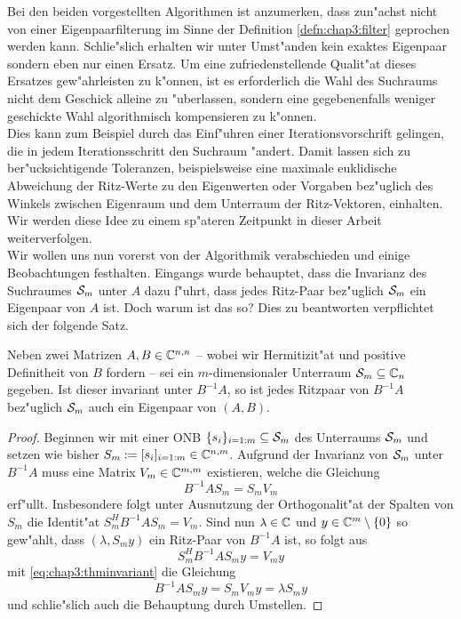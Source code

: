 Bei den beiden vorgestellten Algorithmen ist anzumerken, dass zun"achst nicht von einer Eigenpaarfilterung im Sinne der Definition \ref{defn:chap3:filter} geprochen werden kann.
Schlie"slich erhalten wir unter Umst"anden kein exaktes Eigenpaar sondern eben nur einen Ersatz.
Um eine zufriedenstellende Qualit"at dieses Ersatzes gew"ahrleisten zu k"onnen, ist es erforderlich die Wahl des Suchraums nicht dem Geschick alleine zu "uberlassen, sondern eine gegebenenfalls weniger geschickte Wahl algorithmisch kompensieren zu k"onnen.\\

Dies kann zum Beispiel durch das Einf"uhren einer Iterationsvorschrift gelingen, die in jedem Iterationsschritt den Suchraum "andert.
Damit lassen sich zu ber"ucksichtigende Toleranzen, beispielsweise eine maximale euklidische Abweichung der Ritz-Werte zu den Eigenwerten oder Vorgaben bez"uglich des Winkels zwischen Eigenraum und dem Unterraum der Ritz-Vektoren, einhalten.
Wir werden diese Idee zu einem sp"ateren Zeitpunkt in dieser Arbeit weiterverfolgen.\\

Wir wollen uns nun vorerst von der Algorithmik verabschieden und einige Beobachtungen
festhalten. Eingangs wurde behauptet, dass die Invarianz des Suchraumes $\S_m$ unter
$A$ dazu f"uhrt, dass jedes Ritz-Paar bez"uglich $\S_m$ ein Eigenpaar von $A$ ist.
Doch warum ist das so? Dies zu beantworten verpflichtet sich der folgende Satz.

\newpage

\begin{thm}\label{thm:chap3:invariant}
Neben zwei Matrizen $A,B\in\Cnn$ -- wobei wir Hermitizit"at und positive Definitheit von $B$ fordern -- sei ein $m$-dimensionaler Unterraum $\S_m \subseteq \C_n$ gegeben.
Ist dieser invariant unter $B^{-1}A$, so ist jedes Ritzpaar von $B^{-1}A$
bez"uglich $\S_m$ auch ein Eigenpaar von $(A,B)$.
\end{thm}

\begin{proof}
Beginnen wir mit einer ONB $\{s_i\}_{i=1:m}\subseteq\S_m$ des Unterraums $\S_m$
und setzen wie bisher $S_m := [s_i]_{i=1:m}\in\C^{n,m}$. Aufgrund der Invarianz
von $\S_m$ unter $B^{-1}A$ muss eine Matrix $V_m \in \C^{m,m}$ existieren, welche
die Gleichung
\begin{equation}\label{eq:chap3:thminvariant}
B^{-1}A S_m = S_m V_m
\end{equation}
erf"ullt. Insbesondere folgt unter Ausnutzung der Orthogonalit"at der Spalten
von $S_m$ die Identit"at $S_m^H B^{-1}A S_m = V_m$.
Sind nun $\lambda\in\C$ und $y\in\C^m\setminus\{0\}$ so gew"ahlt, dass $(\lambda, S_m y)$
ein Ritz-Paar von $B^{-1}A$ ist, so folgt aus
\[
S_m^H B^{-1}A S_m y = V_m y
\]
mit \eqref{eq:chap3:thminvariant} die Gleichung
\[
B^{-1}AS_m y = S_m V_m y = \lambda S_m y
\]
und schlie"slich auch die Behauptung durch Umstellen.
\end{proof}

